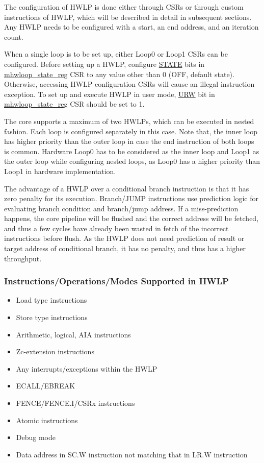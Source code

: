 \documentclass[main\_\_EN.tex]{subfiles}
\begin{document}
The configuration of HWLP is done either through CSRs or through custom instructions of HWLP, which will be described in detail in subsequent sections. Any HWLP needs to be configured with a start, an end address, and an iteration count.

When a single loop is to be set up, either Loop0 or Loop1 CSRs can be configured. Before setting up a HWLP, configure \hyperref[regdesc:mhwlp_state_reg]{STATE} bits in \hyperref[sec:riscvcpu-hwloop-reg-desc]{mhwloop\_state\_reg} CSR to any value other than 0 (OFF, default state). Otherwise, accessing HWLP configuration CSRs will cause an illegal instruction exception. To set up and execute HWLP in user mode, \hyperref[regdesc:mhwlp_state_reg]{URW} bit in \hyperref[sec:riscvcpu-hwloop-reg-desc]{mhwloop\_state\_reg} CSR should be set to 1.

The core supports a maximum of two HWLPs, which can be executed in nested fashion. Each loop is configured separately in this case. Note that, the inner loop has higher priority than the outer loop in case the end instruction of both loops is common. Hardware Loop0 has to be considered as the inner loop and Loop1 as the outer loop while configuring nested loops, as Loop0 has a higher priority than Loop1 in hardware implementation.

The advantage of a HWLP over a conditional branch instruction is that it has zero penalty for its execution. Branch/JUMP instructions use prediction logic for evaluating branch condition and branch/jump address. If a miss-prediction happens, the core pipeline will be flushed and the correct address will be fetched, and thus a few cycles have already been wasted in fetch of the incorrect instructions before flush. As the HWLP does not need prediction of result or target address of conditional branch, it has no penalty, and thus has a higher throughput.

\subsubsection{Instructions/Operations/Modes Supported in HWLP}
\label{sec:riscvcpu-hwloop-inst}

\begin{itemize}
    \item Load type instructions
    \item Store type instructions
    \item Arithmetic, logical, AIA instructions
    \item Zc-extension instructions
    \item Any interrupts/exceptions within the HWLP
    \item ECALL/EBREAK
    \item FENCE/FENCE.I/CSRx instructions
    \item Atomic instructions
    \item Debug mode
    \item Data address in SC.W instruction not matching that in LR.W instruction
\end{itemize}
\end{document}

